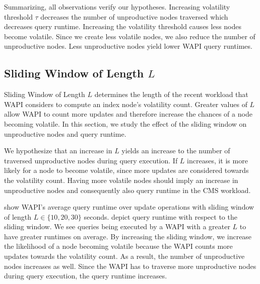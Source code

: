 \documentclass[abstracton,12pt]{scrartcl}
\theoremstyle{definition}
\begin{document}
Summarizing, all observations verify our hypotheses.
Increasing volatility threshold $\tau$ decreases the number of unproductive
nodes traversed which decreases query runtime. Increasing the volatility
threshold causes less nodes become volatile. Since we create less volatile
nodes, we also reduce the number of unproductive nodes. Less unproductive
nodes yield lower WAPI query runtimes. 

\subsection{Sliding Window of Length $L$}

\label{sec:sliding-window}

Sliding Window of Length $L$ determines the length of the recent workload that WAPI
considers to compute an index node's volatility count. Greater values of $L$
allow WAPI to count more updates and therefore increase the chances of a node
becoming volatile. In this section, we study
the effect of the sliding window on unproductive nodes and query runtime.

We hypothesize that an increase in $L$ yields an increase to the number of
traversed unproductive nodes during query execution. If $L$ increases, it is
more likely for a node to become volatile, since more updates are considered
towards the volatility count.
Having more volatile nodes should imply an increase in unproductive nodes and
consequently also query runtime in the CMS workload.



 show WAPI's average
query runtime over update operations with sliding window of length $L \in \{10, 20,
30\}$ seconds.
 depict query
runtime with respect to the sliding window. 
We see queries being executed by a WAPI with a greater $L$ to have greater
runtimes on average. By increasing the sliding
window, we increase the likelihood of a node becoming volatile because the WAPI
counts more updates towards the volatility count. As a result, the number of
unproductive nodes increases as well. Since the WAPI has to traverse
more unproductive nodes during query execution, the query runtime increases.
\end{document}
